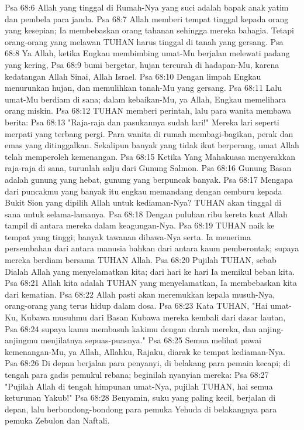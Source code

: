 Psa 68:6  Allah yang tinggal di Rumah-Nya yang suci adalah bapak anak yatim dan pembela para janda.
Psa 68:7  Allah memberi tempat tinggal kepada orang yang kesepian; Ia membebaskan orang tahanan sehingga mereka bahagia. Tetapi orang-orang yang melawan TUHAN harus tinggal di tanah yang gersang.
Psa 68:8  Ya Allah, ketika Engkau membimbing umat-Mu berjalan melewati padang yang kering,
Psa 68:9  bumi bergetar, hujan tercurah di hadapan-Mu, karena kedatangan Allah Sinai, Allah Israel.
Psa 68:10  Dengan limpah Engkau menurunkan hujan, dan memulihkan tanah-Mu yang gersang.
Psa 68:11  Lalu umat-Mu berdiam di sana; dalam kebaikan-Mu, ya Allah, Engkau memelihara orang miskin.
Psa 68:12  TUHAN memberi perintah, lalu para wanita membawa berita:
Psa 68:13  "Raja-raja dan pasukannya sudah lari!" Mereka lari seperti merpati yang terbang pergi. Para wanita di rumah membagi-bagikan, perak dan emas yang ditinggalkan. Sekalipun banyak yang tidak ikut berperang, umat Allah telah memperoleh kemenangan.
Psa 68:15  Ketika Yang Mahakuasa menyerakkan raja-raja di sana, turunlah salju dari Gunung Salmon.
Psa 68:16  Gunung Basan adalah gunung yang hebat, gunung yang berpuncak banyak.
Psa 68:17  Mengapa dari puncakmu yang banyak itu engkau memandang dengan cemburu kepada Bukit Sion yang dipilih Allah untuk kediaman-Nya? TUHAN akan tinggal di sana untuk selama-lamanya.
Psa 68:18  Dengan puluhan ribu kereta kuat Allah tampil di antara mereka dalam keagungan-Nya.
Psa 68:19  TUHAN naik ke tempat yang tinggi; banyak tawanan dibawa-Nya serta. Ia menerima persembahan dari antara manusia bahkan dari antara kaum pemberontak; supaya mereka berdiam bersama TUHAN Allah.
Psa 68:20  Pujilah TUHAN, sebab Dialah Allah yang menyelamatkan kita; dari hari ke hari Ia memikul beban kita.
Psa 68:21  Allah kita adalah TUHAN yang menyelamatkan, Ia membebaskan kita dari kematian.
Psa 68:22  Allah pasti akan meremukkan kepala musuh-Nya, orang-orang yang terus hidup dalam dosa.
Psa 68:23  Kata TUHAN, "Hai umat-Ku, Kubawa musuhmu dari Basan Kubawa mereka kembali dari dasar lautan,
Psa 68:24  supaya kamu membasuh kakimu dengan darah mereka, dan anjing-anjingmu menjilatnya sepuas-puasnya."
Psa 68:25  Semua melihat pawai kemenangan-Mu, ya Allah, Allahku, Rajaku, diarak ke tempat kediaman-Nya.
Psa 68:26  Di depan berjalan para penyanyi, di belakang para pemain kecapi; di tengah para gadis pemukul rebana; beginilah nyanyian mereka:
Psa 68:27  "Pujilah Allah di tengah himpunan umat-Nya, pujilah TUHAN, hai semua keturunan Yakub!"
Psa 68:28  Benyamin, suku yang paling kecil, berjalan di depan, lalu berbondong-bondong para pemuka Yehuda di belakangnya para pemuka Zebulon dan Naftali.

